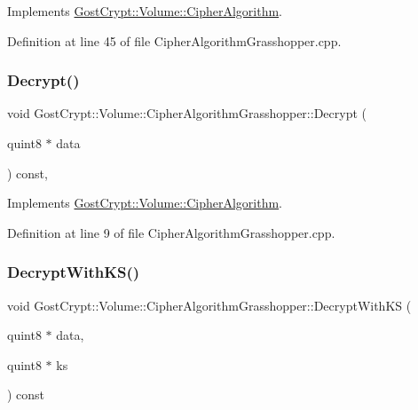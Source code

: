 Implements \hyperlink{class_gost_crypt_1_1_volume_1_1_cipher_algorithm_a53e0b1102294d29252b6438f5bf999aa}{Gost\+Crypt\+::\+Volume\+::\+Cipher\+Algorithm}.



Definition at line 45 of file Cipher\+Algorithm\+Grasshopper.\+cpp.

\mbox{\label{class_gost_crypt_1_1_volume_1_1_cipher_algorithm_grasshopper_aac197107282f4d3382961adb7130548e}} 
\subsubsection{\texorpdfstring{Decrypt()}{Decrypt()}}
{\footnotesize\ttfamily void Gost\+Crypt\+::\+Volume\+::\+Cipher\+Algorithm\+Grasshopper\+::\+Decrypt (\begin{DoxyParamCaption}\item[{quint8 $\ast$}]{data }\end{DoxyParamCaption}) const\hspace{0.3cm}{\ttfamily [protected]}, {\ttfamily [virtual]}}



Implements \hyperlink{class_gost_crypt_1_1_volume_1_1_cipher_algorithm_a014d9a3b3db18ec963c0e524b4f0d445}{Gost\+Crypt\+::\+Volume\+::\+Cipher\+Algorithm}.



Definition at line 9 of file Cipher\+Algorithm\+Grasshopper.\+cpp.

\mbox{\label{class_gost_crypt_1_1_volume_1_1_cipher_algorithm_grasshopper_a4a5845fc432ef4c16bf94b0c6d5973e2}} 
\subsubsection{\texorpdfstring{Decrypt\+With\+K\+S()}{DecryptWithKS()}}
{\footnotesize\ttfamily void Gost\+Crypt\+::\+Volume\+::\+Cipher\+Algorithm\+Grasshopper\+::\+Decrypt\+With\+KS (\begin{DoxyParamCaption}\item[{quint8 $\ast$}]{data,  }\item[{quint8 $\ast$}]{ks }\end{DoxyParamCaption}) const\hspace{0.3cm}{\ttfamily [virtual]}}



